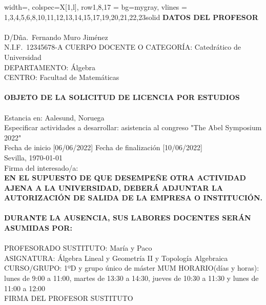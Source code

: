 \documentclass[a4paper,10pt]{article}
\begin{document}
\begin{minipage}{0.7\textwidth}
\begin{longtblr}{width=\textwidth, colspec={X[1,l]}, row{1,8,17} = {bg=mygray}, vlines =
{1,3,4,5,6,8,10,11,12,13,14,15,17,19,20,21,22,23}{solid}}
\hline
\textbf{DATOS DEL PROFESOR} \\
\hline
{} \\[-5mm]
\hline
\small D/Dña.~Fernando Muro Jiménez \\
\small N.I.F.~12345678-A CUERPO DOCENTE O CATEGORÍA: Catedrático de Universidad \\
\small DEPARTAMENTO: Álgebra \\
\small CENTRO: Facultad de Matemáticas \\
\hline
{} \\[-5mm]
\hline
\textbf{OBJETO DE LA SOLICITUD DE LICENCIA POR ESTUDIOS} \\
\hline
{} \\[-5mm]
\hline
Estancia en: Aalesund, Noruega \\
Especificar actividades a desarrollar: asistencia al congreso "The Abel Symposium 2022" \\
Fecha de inicio [06/06/2022] Fecha de finalización [10/06/2022] \\
\centering Sevilla, \today \\[-2mm]
\centering Firma del interesado/a: \\[10mm]
\textbf{EN EL SUPUESTO DE QUE DESEMPEÑE OTRA ACTIVIDAD AJENA A LA UNIVERSIDAD, DEBERÁ ADJUNTAR LA AUTORIZACIÓN DE SALIDA
DE LA EMPRESA O INSTITUCIÓN.} \\
\hline
{} \\[-5mm]
\hline
\textbf{DURANTE LA AUSENCIA, SUS LABORES DOCENTES SERÁN ASUMIDAS POR:} \\
\hline
{} \\[-5mm]
\hline
\small PROFESORADO SUSTITUTO: María y Paco\\
\small ASIGNATURA: Álgebra Lineal y Geometría II y Topología Algebraica\\
\small CURSO/GRUPO: 1ºD y grupo único de máster MUM HORARIO(días y horas): lunes de 9:00 a 11:00, martes de 13:30 a 14:30, jueves de 10:30 a 11:30 y lunes de 11:00 a 12:00\\
\centering\small FIRMA DEL PROFESOR SUSTITUTO \\[10mm]
\hline
\end{longtblr}
\end{minipage}

\vspace{-3mm}
\end{document}
